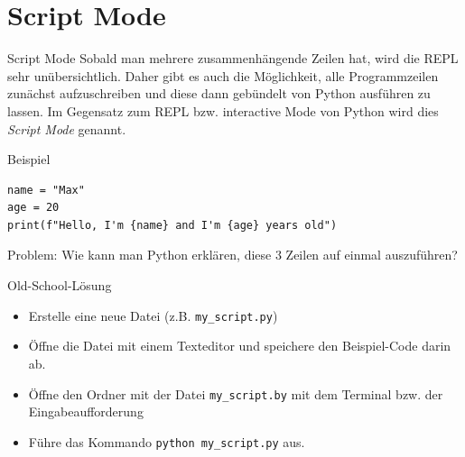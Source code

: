 \documentclass[algorithm,pgfplots,colortheme=dark]{cuzbeamer}
\newcommand{\pybw}[1]{\texttt{#1}}
\begin{document}

\maketitle



%


\section{Script Mode}
\begin{frame}
\begin{block}{Script Mode}
	\vspace{2pt}
	Sobald man mehrere zusammenhängende Zeilen hat, wird die REPL sehr unübersichtlich. Daher gibt es auch die Möglichkeit, alle Programmzeilen zunächst aufzuschreiben und diese dann gebündelt von Python ausführen zu lassen. Im Gegensatz zum REPL bzw. interactive Mode von Python wird dies \emph{Script Mode} genannt.    
\end{block}
\end{frame}

\begin{fragile}[]
\begin{exampleblock}{Beispiel}
\begin{verbatim}
name = "Max"
age = 20
print(f"Hello, I'm {name} and I'm {age} years old") 
\end{verbatim}
\end{exampleblock}
\pause
\begin{alertblock}{Problem:}
\vspace{2pt}
Wie kann man Python erklären, diese 3 Zeilen auf einmal auszuführen? 
\end{alertblock}
\end{fragile}

\begin{frame}
\begin{block}{Old-School-Lösung}
\vspace{2pt}
\begin{itemize}
	\item Erstelle eine neue Datei (z.B. \pybw{my_script.py})
	\item Öffne die Datei mit einem Texteditor und speichere den Beispiel-Code darin ab.
	\item Öffne den Ordner mit der Datei \pybw{my_script.by} mit dem Terminal bzw. der Eingabeaufforderung
	\item Führe das Kommando \pybw{python my_script.py} aus. 
\end{itemize}
\end{block}
\end{frame}
\end{document}
